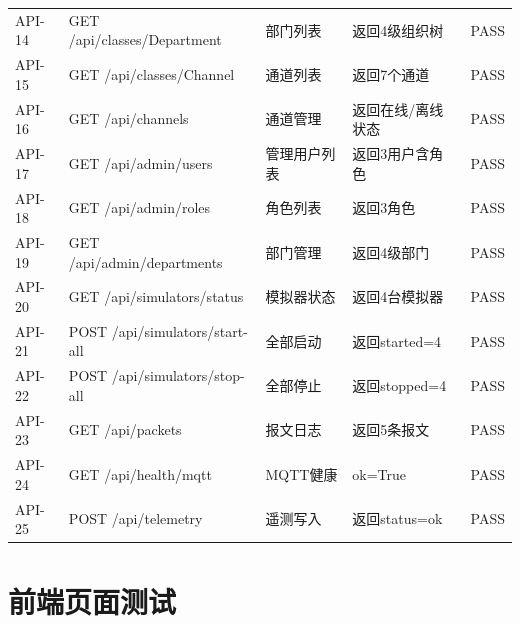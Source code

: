 \documentclass[11pt,a4paper]{ctexart}
\begin{document}
\begin{longtable}{p{1.8cm} p{2.5cm} p{5.5cm} p{2.5cm} p{2cm}}
API-14 & GET /api/classes/Department & 部门列表 & 返回4级组织树 & PASS \\
API-15 & GET /api/classes/Channel & 通道列表 & 返回7个通道 & PASS \\
API-16 & GET /api/channels & 通道管理 & 返回在线/离线状态 & PASS \\
API-17 & GET /api/admin/users & 管理用户列表 & 返回3用户含角色 & PASS \\
API-18 & GET /api/admin/roles & 角色列表 & 返回3角色 & PASS \\
API-19 & GET /api/admin/departments & 部门管理 & 返回4级部门 & PASS \\
API-20 & GET /api/simulators/status & 模拟器状态 & 返回4台模拟器 & PASS \\
API-21 & POST /api/simulators/start-all & 全部启动 & 返回started=4 & PASS \\
API-22 & POST /api/simulators/stop-all & 全部停止 & 返回stopped=4 & PASS \\
API-23 & GET /api/packets & 报文日志 & 返回5条报文 & PASS \\
API-24 & GET /api/health/mqtt & MQTT健康 & ok=True & PASS \\
API-25 & POST /api/telemetry & 遥测写入 & 返回status=ok & PASS \\
\bottomrule
\end{longtable}

\section{前端页面测试}
\end{document}
